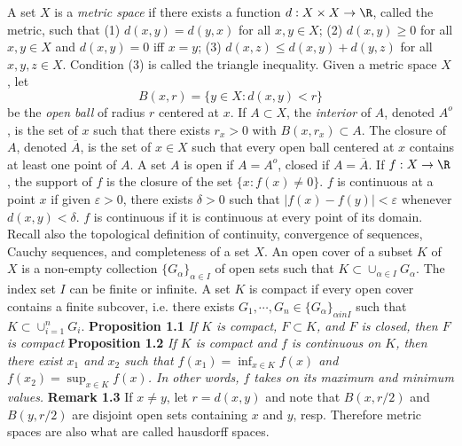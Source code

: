 \begin{sloppypar}
\indent A set $X$ is a \textit{metric space} if there exists a function $d: X \times X \to \R$, called the metric, such that 
\newline (1) $d(x,y) = d(y,x)$ for all $x,y \in X$;
\newline (2) $d(x,y) \geq 0$ for all $x,y \in X$ and $d(x,y) = 0$ iff $x = y$;
\newline (3) $d(x,z) \leq d(x,y) + d(y,z)$ for all $x,y,z \in X$.
\newline \indent Condition (3) is called the triangle inequality.
\medskip
\newline \indent Given a metric space $X$, let
$$B(x,r) = \lbrace y \in X: d(x,y) < r \rbrace$$
be the \textit{open ball} of radius $r$ centered at $x$.
If $A \subset X$, the \textit{interior} of $A$, denoted $A^o$, is the set of $x$ such that there exists $r_x > 0$ with $B(x,r_x) \subset A$.
The closure of $A$, denoted $\overline{A}$, is the set of $x \in X$ such that every open ball centered at $x$ contains at least one point of $A$.
A set $A$ is open if $A = A^o$, closed if $A = \overline{A}$.
If $f: X \to \R$, the support of $f$ is the closure of the set $\lbrace x: f(x) \neq 0 \rbrace$. $f$ is continuous at a point $x$ if given $\varepsilon > 0$, there exists $\delta > 0$ such that $|f(x) - f(y)| < \varepsilon$ whenever $d(x,y) < \delta$.
$f$ is continuous if it is continuous at every point of its domain.
\newline \indent Recall also the topological definition of continuity, convergence of sequences, Cauchy sequences, and completeness of a set $X$.
\newline \indent An open cover of a subset $K$ of $X$ is a non-empty collection $\lbrace G_\alpha \rbrace_{\alpha \in I}$ of open sets such that $K \subset \cup_{\alpha \in I}G_{\alpha}$. The index set $I$ can be finite or infinite. A set $K$ is compact if every open cover contains a finite subcover, i.e. there exists $G_1,\cdots,G_n \in \lbrace G_\alpha \rbrace_{\alpha in I}$ such that $K \subset \cup^n_{i=1}G_i$.
\pagebreak
\newline \textbf{Proposition 1.1} \textit{If $K$ is compact, $F \subset K$, and $F$ is closed, then $F$ is compact}
\medskip \newline \textbf{Proposition 1.2} \textit{If $K$ is compact and $f$ is continuous on $K$, then there exist $x_1$ and $x_2$ such that $f(x_1) = \inf_{x \in K} f(x)$ and $f(x_2) = \sup_{x \in K} f(x)$. In other words, $f$ takes on its maximum and minimum values.}
\medskip \newline \textbf{Remark 1.3} If $x \neq y$, let $r = d(x,y)$ and note that $B(x,r/2)$ and $B(y,r/2)$ are disjoint open sets containing $x$ and $y$, resp. Therefore metric spaces are also what are called hausdorff spaces.

\end{sloppypar}
